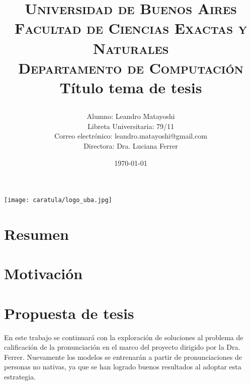 \documentclass[a4paper,12pt]{article} %
\title{	
\normalfont \normalsize 
\textsc{Universidad de Buenos Aires \\ Facultad de Ciencias Exactas y Naturales \\ Departamento de Computaci\'on} \\ [25pt] %
\huge Título tema de tesis\\ %
\date{\today}
\vspace{20px}
}
\author{
	Alumno: Leandro Matayoshi \\ 
	Libreta Universitaria: 79/11 \\ 
	Correo electr\'onico: leandro.matayoshi@gmail.com \\ 
	Directora: Dra. Luciana Ferrer
	\vspace{10px}
}
\begin{document}

\begin{titlepage}
\maketitle
\begin{minipage}[t]{\textwidth}
    \begin{minipage}[t]{.55 \textwidth}
        \texttt{[image: caratula/logo\_uba.jpg]}
    \end{minipage}%
\end{minipage}%
\end{titlepage}


\section{Resumen}


\section{Motivación}


\section{Propuesta de tesis}

En este trabajo se continuará con la exploración de soluciones al problema de calificación
de la pronunciación en el marco del proyecto dirigido por la Dra. Ferrer. Nuevamente 
los modelos se entrenarán a partir de pronunciaciones de personas no nativas,
ya que se han logrado buenos resultados al adoptar esta estrategia.
\end{document}

